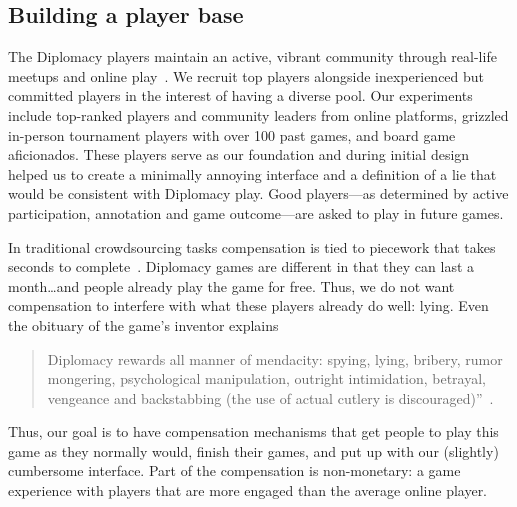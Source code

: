 \subsection{Building a player base}



The Diplomacy players maintain an active, vibrant community through
real-life meetups and online play~\citep{AmericanLife2014,
  chiodini2020backstabbr}.
%
We recruit top players alongside inexperienced but committed players
in the interest of having a diverse pool.
%
Our experiments include top-ranked players and community leaders from online platforms,  grizzled in-person tournament players with over 100 past games, and board game aficionados.
%
These players serve as our foundation and during initial design helped
us to create a minimally annoying interface and a
definition of a lie that would be consistent with Diplomacy play.
%
Good players---as determined by active participation, annotation and
game outcome---are asked to play in future games.

In traditional crowdsourcing tasks compensation is tied
to piecework that takes seconds to complete~\citep{buhrmester2016amazon}.
Diplomacy games are different in that they can last a month\dots and
people already play the game for free.
%
Thus, we do not want compensation to interfere with what these players
already do well: lying.
%
Even the obituary of the game's inventor explains
\begin{quote}
  Diplomacy rewards all manner of mendacity: spying, lying, bribery,
  rumor mongering, psychological manipulation, outright intimidation,
  betrayal, vengeance and backstabbing (the use of actual cutlery is
  discouraged)''~\citep{nytimes}.
\end{quote}
%
Thus, our goal is to have compensation mechanisms that get people to
play this game as they normally would, finish their games, and put up
with our (slightly) cumbersome interface.
%
Part of the compensation is non-monetary: a game experience with
players that are more engaged than the average online player.

